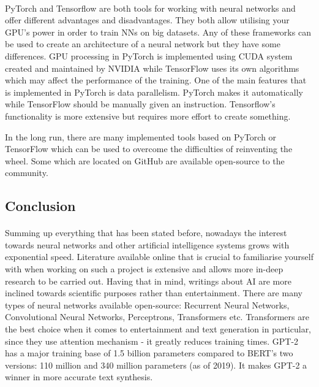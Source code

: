 \documentclass[12pt]{report}
\begin{document}
    \paragraph{}

    PyTorch and Tensorflow are both tools for working with neural networks and offer different advantages and disadvantages. They both allow utilising your GPU's power in order to train NNs on big datasets. Any of these frameworks can be used to create an architecture of a neural network but they have some differences.
    GPU processing in PyTorch is implemented using CUDA system created and maintained by NVIDIA while TensorFlow uses its own algorithms which may affect the performance of the training. One of the main features that is implemented in PyTorch is data parallelism. PyTorch makes it automatically while TensorFlow should be manually given an instruction.
    Tensorflow's functionality is more extensive but requires more effort to create something.

    In the long run, there are many implemented tools based on PyTorch or TensorFlow which can be used to overcome the difficulties of reinventing the wheel. Some which are located on GitHub are available open-source to the community.

    \subsection*{Conclusion}
    \paragraph{}

    Summing up everything that has been stated before, nowadays the interest towards neural networks and other artificial intelligence systems grows with exponential speed. Literature available online that is crucial to familiarise yourself with when working on such a project is extensive and allows more in-deep research to be carried out. Having that in mind, writings about AI are more inclined towards scientific purposes rather than entertainment.
    There are many types of neural networks available open-source: Recurrent Neural Networks, Convolutional Neural Networks, Perceptrons, Transformers etc. Transformers are the best choice when it comes to entertainment and text generation in particular, since they use attention mechanism - it greatly reduces training times. GPT-2 has a major training base of 1.5 billion parameters compared to BERT's two versions: 110 million and 340 million parameters (as of 2019). It makes GPT-2 a winner in more accurate text synthesis.
\end{document}
